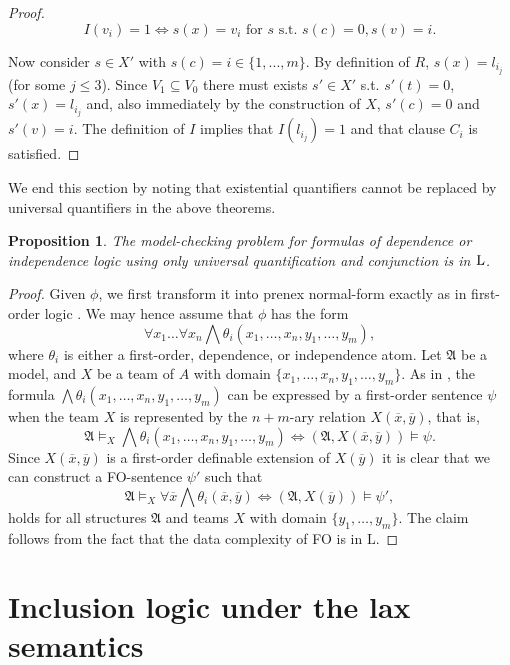 \documentclass{article}
\theoremstyle{plain}
\newtheorem{proposition}[theorem]{Proposition}
\theoremstyle{definition}
\newcommand{\mA}{{\mathfrak A}}
\newcommand{\logspace}{{\rm L}}
\newcommand{\tu}[1]{\overline{#1}}
\begin{document}
\begin{proof}
 \[ I(v_i)=1 \iff s(x)=v_i \mbox{ for } s \mbox{ s.t. } s(c)=0, s(v)=i.\]

Now consider $s\in X'$ with $s(c)=i\in \{1,...,m\}$. By definition of $R$, $s(x)=l_{i_j}$ (for some $j\leq 3$). Since $V_1\subseteq V_0$ there must exists $s'\in X'$ s.t. $s'(t)=0$, $s'(x)=l_{i_j}$ and, also immediately by the construction of $X$, $s'(c)=0$ and $s'(v)=i$. The definition of $I$ implies that $I(l_{i_j})=1$ and that clause $C_i$ is satisfied.
\end{proof}






We end this section by noting that existential quantifiers cannot be replaced by universal quantifiers in the above theorems.

\begin{proposition}\label{forall+wedge} The model-checking problem for formulas of  dependence or independence  logic using only  universal quantification and conjunction is in $\logspace$.
\end{proposition}


\begin{proof} Given $\phi$, we first transform it into prenex normal-form exactly as in first-order logic \cite{vaananen07}. We may hence assume that $\phi $ has the form
\[  \forall x_1\ldots \forall x_n \bigwedge \theta_i (x_1,\ldots, x_n,y_1,\ldots,y_m),        \]
where $\theta _i$ is either a first-order, dependence, or independence atom. Let  $\mA$ be a model,  and  $X$ be a team of $A$ with domain $\{x_1,\ldots,x_n,y_1,\ldots,y_m\} $. As in   \cite{vaananen07}, the formula $\bigwedge \theta_i (x_1,\ldots,x_n,y_1,\ldots,y_m)$ can be expressed by a first-order sentence $\psi$ when the team $X$ is represented by the $n+m$-ary relation $X(\tu x,\tu y)$, that is,
$$ \mA\models _X \bigwedge \theta_i (x_1,\ldots,x_n,y_1,\ldots,y_m) \Leftrightarrow (\mA,X(\tu x,\tu y))\models \psi. $$
Since $X(\tu x,\tu y)$ is a first-order definable extension of  $X(\tu y)$ it is clear that we can construct a FO-sentence $\psi'$ such that 
$$ \mA\models _X  \forall \tu x \bigwedge \theta_i (\tu x,\tu y) \Leftrightarrow (\mA,X(\tu y))\models \psi', $$
holds for all structures $\mA$ and teams $X$ with domain $\{y_1,\ldots,y_m\}$. The claim follows from the fact that the data complexity of FO is in $\mathrm{L}$.
\end{proof}




\section{Inclusion logic under the lax semantics}
\end{document}
